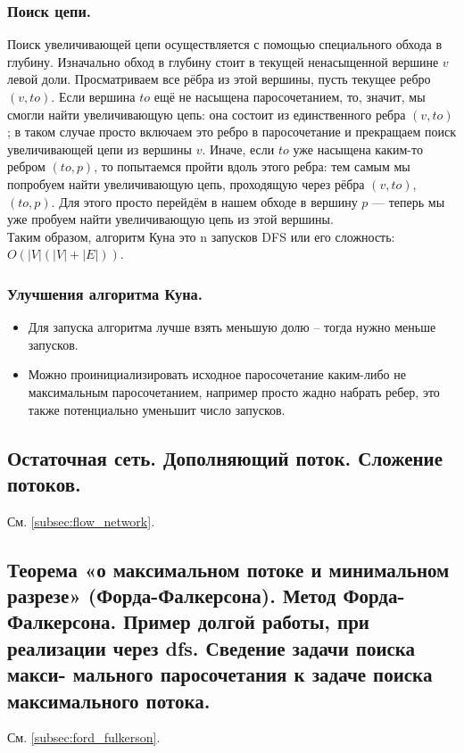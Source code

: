 \documentclass[a4paper,14pt]{article}
\begin{document}
    \subsubsection*{Поиск цепи.}
    Поиск увеличивающей цепи осуществляется с помощью
специального обхода в глубину. Изначально обход в глубину стоит в
текущей ненасыщенной вершине $v$ левой доли. Просматриваем все
рёбра из этой вершины, пусть текущее ребро $(v,to)$. Если вершина
$to$ ещё не насыщена паросочетанием, то, значит, мы смогли найти
увеличивающую цепь: она состоит из единственного ребра $(v,to)$; в
таком случае просто включаем это ребро в паросочетание и
прекращаем поиск увеличивающей цепи из вершины $v$. Иначе, если
$to$ уже насыщена каким-то ребром $(to,p)$, то попытаемся пройти
вдоль этого ребра: тем самым мы попробуем найти увеличивающую
цепь, проходящую через рёбра $(v,to)$, $(to,p)$. Для этого просто
перейдём в нашем обходе в вершину $p$ — теперь мы уже пробуем
найти увеличивающую цепь из этой вершины. \\

Таким образом, алгоритм Куна это n запусков DFS или его
сложность: $O(|V|(|V|+|E|))$.

    \subsubsection*{Улучшения алгоритма Куна.}
    \begin{itemize}
        \item Для запуска алгоритма лучше взять меньшую долю – тогда
        нужно меньше запусков.
        \item Можно проинициализировать исходное паросочетание
        каким-либо не максимальным паросочетанием, например
        просто жадно набрать ребер, это также потенциально
        уменьшит число запусков.
    \end{itemize}
    \subsection{Остаточная сеть. Дополняющий поток. Сложение потоков.}
    См. \ref{subsec:flow_network}.
    \subsection{Теорема «о максимальном потоке и минимальном разрезе» (Форда-Фалкерсона). Метод Форда-
    Фалкерсона. Пример долгой работы, при реализации через dfs. Сведение задачи поиска макси-
    мального паросочетания к задаче поиска максимального потока.}
    См. \ref{subsec:ford_fulkerson}.
\end{document}

